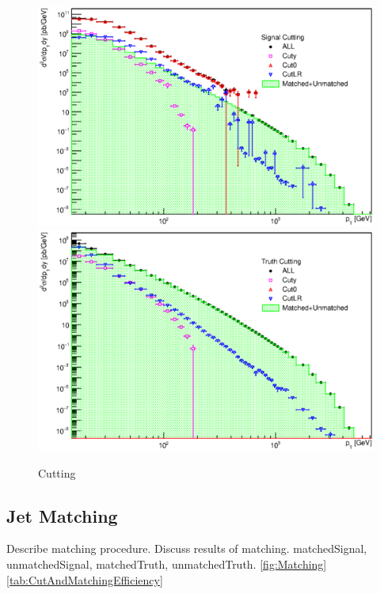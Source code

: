 \begin{figure}[p]
  \centering
  \includegraphics[width=\textwidth]{Chapter3/SignalCutting.eps}
  \includegraphics[width=\textwidth]{Chapter3/TruthCutting.eps}
  \caption{Cutting}
  \label{fig:Cutting}
\end{figure}

\subsection{Jet Matching}

Describe matching procedure.  
Discuss results of matching.
matchedSignal, unmatchedSignal, matchedTruth, unmatchedTruth.
\ref{fig:Matching}
\ref{tab:CutAndMatchingEfficiency}

